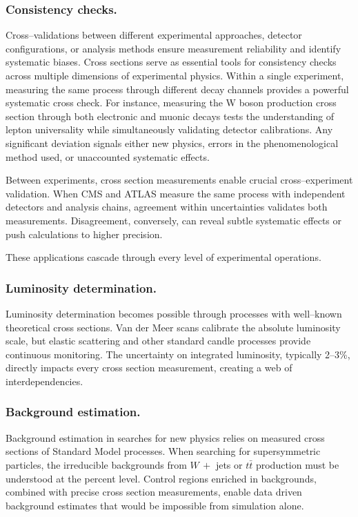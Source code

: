 \begin{definition}
        \subsubsection{Consistency checks.}
            Cross--validations between different experimental approaches, detector configurations, or analysis methods ensure measurement reliability and identify systematic biases.
            Cross sections serve as essential tools for consistency checks across multiple dimensions of experimental physics.
            Within a single experiment, measuring the same process through different decay channels provides a powerful systematic cross check.
            For instance, measuring the W boson production cross section through both electronic and muonic decays tests the understanding of lepton universality while simultaneously validating detector calibrations.
            Any significant deviation signals either new physics, errors in the phenomenological method used, or unaccounted systematic effects.
            
            Between experiments, cross section measurements enable crucial cross--experiment validation.
            When CMS and ATLAS measure the same process with independent detectors and analysis chains, agreement within uncertainties validates both measurements.
            Disagreement, conversely, can reveal subtle systematic effects or push calculations to higher precision.

            These applications cascade through every level of experimental operations.
        \subsubsection{Luminosity determination.}
            Luminosity determination becomes possible through processes with well--known theoretical cross sections.
            Van der Meer scans calibrate the absolute luminosity scale, but elastic scattering and other standard candle processes provide continuous monitoring.
            The uncertainty on integrated luminosity, typically \numrange{2}{3}\%, directly impacts every cross section measurement, creating a web of interdependencies.
            
        \subsubsection{Background estimation.}
            Background estimation in searches for new physics relies on measured cross sections of Standard Model processes.
            When searching for supersymmetric particles, the irreducible backgrounds from \(W\, +\) jets or \(t\bar t\) production must be understood at the percent level.
            Control regions enriched in backgrounds, combined with precise cross section measurements, enable data driven background estimates that would be impossible from simulation alone.

\end{definition}
